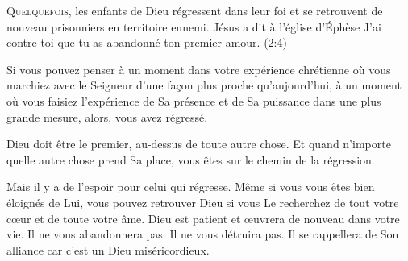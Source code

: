 \dvrule







\lettrine{Q}{uelquefois,} les enfants de Dieu régressent dans leur foi
 et se retrouvent de nouveau prisonniers en territoire ennemi.
 Jésus a dit à l'église d'Éphèse\frcolon{}
 \Og J'ai contre toi que tu as abandonné ton premier amour. \Fg{}
 (2:4)

Si vous pouvez penser à un moment dans votre expérience chrétienne
 où vous marchiez avec le Seigneur d'une fa\c{c}on plus proche qu'aujourd'hui,
 à un moment où vous faisiez l'expérience de Sa présence et de Sa puissance
 dans une plus grande mesure, alors, vous avez régressé.


Dieu doit être le premier, au-dessus de toute autre chose.
 Et quand n'importe quelle autre chose prend Sa place,
 vous êtes sur le chemin de la régression.

Mais il y a de l'espoir pour celui qui régresse.
 Même si vous vous êtes bien éloignés de Lui, vous pouvez retrouver Dieu
 si vous Le recherchez de tout votre c\oe{}ur et de toute votre âme.
 Dieu est patient et \oe{}uvrera de nouveau dans votre vie.
 Il ne vous abandonnera pas. Il ne vous détruira pas.
 Il se rappellera de Son alliance car c'est un Dieu miséricordieux. 

\dvrule

